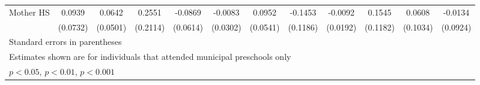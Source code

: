 \begin{table}[htbp]
\begin{tabular}{l*{11}{c}}
\addlinespace
Mother HS   &      0.0939         &      0.0642         &      0.2551         &     -0.0869         &     -0.0083         &      0.0952         &     -0.1453         &     -0.0092         &      0.1545         &      0.0608         &     -0.0134         \\
            &    (0.0732)         &    (0.0501)         &    (0.2114)         &    (0.0614)         &    (0.0302)         &    (0.0541)         &    (0.1186)         &    (0.0192)         &    (0.1182)         &    (0.1034)         &    (0.0924)         \\
\bottomrule
\multicolumn{12}{l}{\footnotesize Standard errors in parentheses}\\
\multicolumn{12}{l}{\footnotesize Estimates shown are for individuals that attended municipal preschools only}\\
\multicolumn{12}{l}{\footnotesize \sym{*} \(p<0.05\), \sym{**} \(p<0.01\), \sym{***} \(p<0.001\)}\\
\end{tabular}
\end{table}
